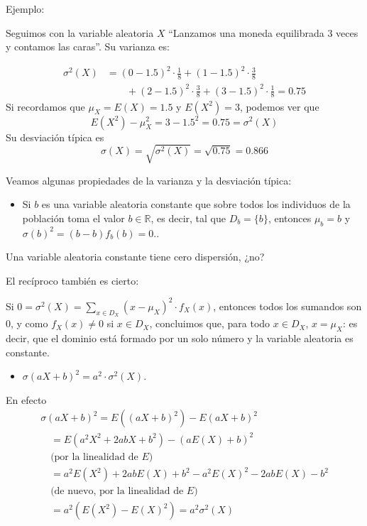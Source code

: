 \documentclass[
  spanish,
  letterpaper,
  DIV=11,
  numbers=noendperiod]{scrreprt}
\providecommand{\tightlist}{%
  \setlength{\itemsep}{0pt}\setlength{\parskip}{0pt}}
\begin{document}
Ejemplo:

Seguimos con la variable aleatoria \(X\) ``Lanzamos una moneda
equilibrada 3 veces y contamos las caras''. Su varianza es:

\[
\begin{array}{rl}
\sigma^2(X) \!\!\!\!\! & \displaystyle=(0-1.5)^2\cdot \frac{1}{8}+(1-1.5)^2\cdot \frac{3}{8}\\ &\displaystyle\qquad +(2-1.5)^2\cdot \frac{3}{8}+(3-1.5)^2\cdot \frac{1}{8}=0.75
\end{array}
\] Si recordamos que \(\mu_X=E(X)=1.5\) y \(E(X^2)=3\), podemos ver que
\[
E(X^2)-\mu_X^2=3-1.5^2=0.75=\sigma^2(X)
\] Su desviación típica es \[
\sigma(X) =\sqrt{\sigma^2(X)}=\sqrt{0.75}= 0.866
\]

Veamos algunas propiedades de la varianza y la desviación típica:

\begin{itemize}
\tightlist
\item
  Si \(b\) es una variable aleatoria constante que sobre todos los
  individuos de la población toma el valor \(b\in \mathbb{R}\), es
  decir, tal que \(D_b=\{b\}\), entonces \(\mu_b=b\) y
  \(\sigma(b)^2=(b-b)f_b(b)=0\)..
\end{itemize}

Una variable aleatoria constante tiene cero dispersión, ¿no?

El recíproco también es cierto:

Si \(0=\sigma^2(X)=\sum_{x\in D_X} (x-\mu_X)^2\cdot f_X(x)\), entonces
todos los sumandos son 0, y como \(f_X(x)\neq 0\) si \(x\in D_X\),
concluimos que, para todo \(x\in D_X\), \(x=\mu_X\): es decir, que el
dominio está formado por un solo número y la variable aleatoria es
constante.

\begin{itemize}
\tightlist
\item
  \(\sigma(aX+b)^2=a^2\cdot \sigma^2(X)\).
\end{itemize}

En efecto \[
\begin{array}{l}
\sigma(aX+b)^2 =E((aX+b)^2)-E(aX+b)^2\\
\quad = E(a^2X^2+2abX+b^2)-(aE(X)+b)^2\\
\quad \text{(por la linealidad de $E$)}\\
\quad = a^2E(X^2)+2abE(X)+b^2-a^2E(X)^2-2abE(X)-b^2\\
\quad \text{(de nuevo, por la linealidad de $E$)}\\
\quad = a^2(E(X^2)-E(X)^2)=a^2\sigma^2(X)
\end{array}
\]
\end{document}

